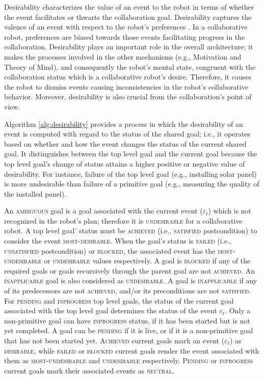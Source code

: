 \documentclass{article}
\begin{document}
Desirability characterizes the value of an event to the robot in terms of
whether the event facilitates or thwarts the collaboration goal. Desirability
captures the valence of an event with respect to the robot's preferences
\cite{gratch:domain-independent}. In a collaborative robot, preferences are
biased towards those events facilitating progress in the collaboration.
Desirability plays an important role in the overall architecture; it makes the
processes involved in the other mechanisms (e.g., Motivation and Theory of
Mind), and consequently the robot's mental state, congruent with the
collaboration status which is a collaborative robot's desire. Therefore, it
causes the robot to dismiss events causing inconsistencies in the robot's
collaborative behavior. Moreover, desirability is also crucial from the
collaboration's point of view.

Algorithm \ref{alg:desirability} provides a process in which the desirability of
an event is computed with regard to the status of the shared goal; i.e., it
operates based on whether and how the event changes the status of the current
shared goal. It distinguishes between the top level goal and the current goal
because the top level goal's change of status attains a higher positive or
negative value of desirability. For instance, failure of the top level goal
(e.g., installing solar panel) is more undesirable than failure of a primitive
goal (e.g., measuring the quality of the installed panel).

An \textsc{ambiguous} goal is a goal associated with the current event
($\varepsilon_t$) which is not recognized in the robot's plan; therefore it is
\textsc{undesirable} for a collaborative robot. A top level goal' status must be
\textsc{achieved} (i.e., \textsc{satisfied} postcondition) to consider the event
\textsc{most-desirable}. When the goal's status is \textsc{failed} (i.e.,
\textsc{unsatisfied} postcondition) or \textsc{blocked}, the associated event
has the \textsc{most-undesirable} or \textsc{undesirable} values respectively.
A goal is \textsc{blocked} if any of the required goals or goals recursively
through the parent goal are not \textsc{achieved}. An \textsc{inapplicable} goal
is also considered as \textsc{undesirable}. A goal is \textsc{inapplicable} if
any of its predecessors are not \textsc{achieved}, and/or its preconditions are
not \textsc{satisfied}. For \textsc{pending} and \textsc{inprogress} top level
goals, the status of the current goal associated with the top level goal
determines the status of the event $\varepsilon_t$. Only a non-primitive goal
can have \textsc{inprogress} status, if it has been started but is not yet
completed. A goal can be \textsc{pending} if it is live, or if it is a
non-primitive goal that has not been started yet. \textsc{Achieved} current
goals mark an event ($\varepsilon_t$) as \textsc{desirable}, while
\textsc{failed} or \textsc{blocked} current goals render the event associated
with them as \textsc{most-undesirable} and \textsc{undesirable} respectively.
\textsc{Pending} or \textsc{inprogress} current goals mark their associated
events as \textsc{neutral}.
\end{document}
